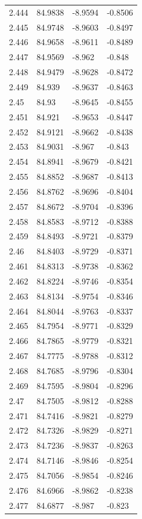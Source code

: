 \begin{tabular}{llll}
2.444 & 84.9838 & -8.9594 & -0.8506 \\
2.445 & 84.9748 & -8.9603 & -0.8497 \\
2.446 & 84.9658 & -8.9611 & -0.8489 \\
2.447 & 84.9569 & -8.962 & -0.848 \\
2.448 & 84.9479 & -8.9628 & -0.8472 \\
2.449 & 84.939 & -8.9637 & -0.8463 \\
2.45 & 84.93 & -8.9645 & -0.8455 \\
2.451 & 84.921 & -8.9653 & -0.8447 \\
2.452 & 84.9121 & -8.9662 & -0.8438 \\
2.453 & 84.9031 & -8.967 & -0.843 \\
2.454 & 84.8941 & -8.9679 & -0.8421 \\
2.455 & 84.8852 & -8.9687 & -0.8413 \\
2.456 & 84.8762 & -8.9696 & -0.8404 \\
2.457 & 84.8672 & -8.9704 & -0.8396 \\
2.458 & 84.8583 & -8.9712 & -0.8388 \\
2.459 & 84.8493 & -8.9721 & -0.8379 \\
2.46 & 84.8403 & -8.9729 & -0.8371 \\
2.461 & 84.8313 & -8.9738 & -0.8362 \\
2.462 & 84.8224 & -8.9746 & -0.8354 \\
2.463 & 84.8134 & -8.9754 & -0.8346 \\
2.464 & 84.8044 & -8.9763 & -0.8337 \\
2.465 & 84.7954 & -8.9771 & -0.8329 \\
2.466 & 84.7865 & -8.9779 & -0.8321 \\
2.467 & 84.7775 & -8.9788 & -0.8312 \\
2.468 & 84.7685 & -8.9796 & -0.8304 \\
2.469 & 84.7595 & -8.9804 & -0.8296 \\
2.47 & 84.7505 & -8.9812 & -0.8288 \\
2.471 & 84.7416 & -8.9821 & -0.8279 \\
2.472 & 84.7326 & -8.9829 & -0.8271 \\
2.473 & 84.7236 & -8.9837 & -0.8263 \\
2.474 & 84.7146 & -8.9846 & -0.8254 \\
2.475 & 84.7056 & -8.9854 & -0.8246 \\
2.476 & 84.6966 & -8.9862 & -0.8238 \\
2.477 & 84.6877 & -8.987 & -0.823 \\

\end{tabular}
